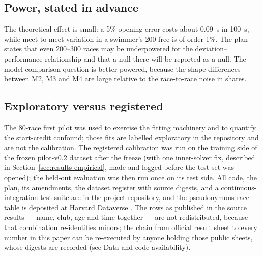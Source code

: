 \subsection{Power, stated in advance}

The theoretical effect is small: a 5\% opening error costs about
0.09~s in 100~s, while meet-to-meet variation in a swimmer's 200 free is of
order 1\%. The plan states that even 200--300 races may be underpowered for
the deviation--performance relationship and that a null there will be
reported as a null. The model-comparison question is better powered, because
the shape differences between M2, M3 and M4 are large relative to the
race-to-race noise in shares.

\subsection{Exploratory versus registered}

The 80-race first pilot was used to exercise the fitting machinery and to
quantify the start-credit confound; those fits are labelled exploratory in
the repository and are not the calibration. The registered calibration was
run on the training side of the frozen pilot-v0.2 dataset after the freeze
(with one inner-solver fix, described in
Section~\ref{sec:results-empirical}, made and logged before the test set
was opened); the held-out evaluation was then run once on its test side. All code, the plan, its amendments, the dataset
register with source digests, and a continuous-integration test suite are in
the project repository, and the pseudonymous race table is deposited at
Harvard Dataverse \citep{joshi2026dataset}. The rows as published in the
source results --- name, club, age and time together --- are not
redistributed, because that combination re-identifies minors; the chain from
official result sheet to every number in this paper can be re-executed by
anyone holding those public sheets, whose digests are recorded (see Data and
code availability).
